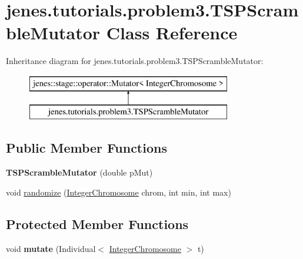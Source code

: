 \hypertarget{classjenes_1_1tutorials_1_1problem3_1_1_t_s_p_scramble_mutator}{\section{jenes.\-tutorials.\-problem3.\-T\-S\-P\-Scramble\-Mutator Class Reference}
\label{classjenes_1_1tutorials_1_1problem3_1_1_t_s_p_scramble_mutator}
}
Inheritance diagram for jenes.\-tutorials.\-problem3.\-T\-S\-P\-Scramble\-Mutator\-:\begin{figure}[H]
\begin{center}
\leavevmode
\includegraphics[height=2.000000cm]{classjenes_1_1tutorials_1_1problem3_1_1_t_s_p_scramble_mutator}
\end{center}
\end{figure}
\subsection*{Public Member Functions}
\begin{DoxyCompactItemize}
\item 
\hypertarget{classjenes_1_1tutorials_1_1problem3_1_1_t_s_p_scramble_mutator_a405cbd7c659b7f1053399d0fa9a5b942}{{\bfseries T\-S\-P\-Scramble\-Mutator} (double p\-Mut)}\label{classjenes_1_1tutorials_1_1problem3_1_1_t_s_p_scramble_mutator_a405cbd7c659b7f1053399d0fa9a5b942}

\item 
void \hyperlink{classjenes_1_1tutorials_1_1problem3_1_1_t_s_p_scramble_mutator_a42d01f9f0cd8138659b8e76fdc41cd1e}{randomize} (\hyperlink{classjenes_1_1chromosome_1_1_integer_chromosome}{Integer\-Chromosome} chrom, int min, int max)
\end{DoxyCompactItemize}
\subsection*{Protected Member Functions}
\begin{DoxyCompactItemize}
\item 
\hypertarget{classjenes_1_1tutorials_1_1problem3_1_1_t_s_p_scramble_mutator_ab355f07bb36d37f05a81eac0cc110b42}{void {\bfseries mutate} (Individual$<$ \hyperlink{classjenes_1_1chromosome_1_1_integer_chromosome}{Integer\-Chromosome} $>$ t)}\label{classjenes_1_1tutorials_1_1problem3_1_1_t_s_p_scramble_mutator_ab355f07bb36d37f05a81eac0cc110b42}

\end{DoxyCompactItemize}


